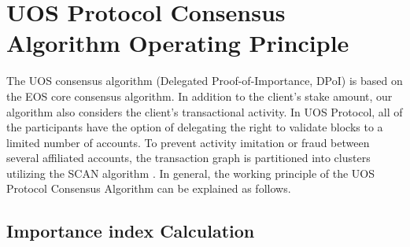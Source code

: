 \documentclass[a4paper,12pt]{article}
\begin{document}

\section{U{\degree}OS Protocol Consensus Algorithm Operating Principle}

The U{\degree}OS consensus algorithm (Delegated Proof-of-Importance, DPoI) is based on the EOS core consensus algorithm. In addition to the client's stake amount, our algorithm also considers the client's transactional activity. In U{\degree}OS Protocol, all of the participants have the option of delegating the right to validate blocks to a limited number of accounts. To prevent activity imitation or fraud between several affiliated accounts, the transaction graph is partitioned into clusters utilizing the SCAN algorithm  \cite{SCAN}. In general, the working principle of the U{\degree}OS Protocol Consensus Algorithm can be explained as follows.


\subsection{Importance index Calculation}
\end{document}

